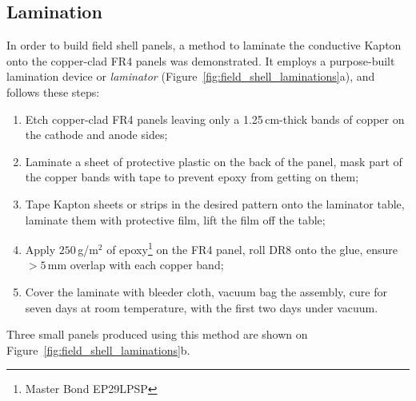 \documentclass[a4paper,12pt]{article}
\newcommand{\DR}{DR8}
\begin{document}

\subsection{Lamination}
\label{sec:lamination}
In order to build field shell panels, a method to laminate the conductive Kapton onto the copper-clad FR4 panels was demonstrated. It employs a purpose-built lamination device or \textit{laminator} (Figure~\ref{fig:field_shell_laminations}a), and follows these steps:
\begin{enumerate}
\item Etch copper-clad FR4 panels leaving only a 1.25\,cm-thick bands of copper on the cathode and anode sides;
\item Laminate a sheet of protective plastic on the back of the panel, mask part of the copper bands with tape to prevent epoxy from getting on them;
\item Tape Kapton sheets or strips in the desired pattern onto the laminator table, laminate them with protective film, lift the film off the table;
\item Apply $250$\,g/m$^2$ of epoxy\footnote{Master Bond EP29LPSP} on the FR4 panel, roll {\DR} onto the glue, ensure $>5\,$mm overlap with each copper band;
\item Cover the laminate with bleeder cloth, vacuum bag the assembly, cure for seven days at room temperature, with the first two days under vacuum.
\end{enumerate}
Three small panels produced using this method are shown on Figure~\ref{fig:field_shell_laminations}b.
\end{document}
